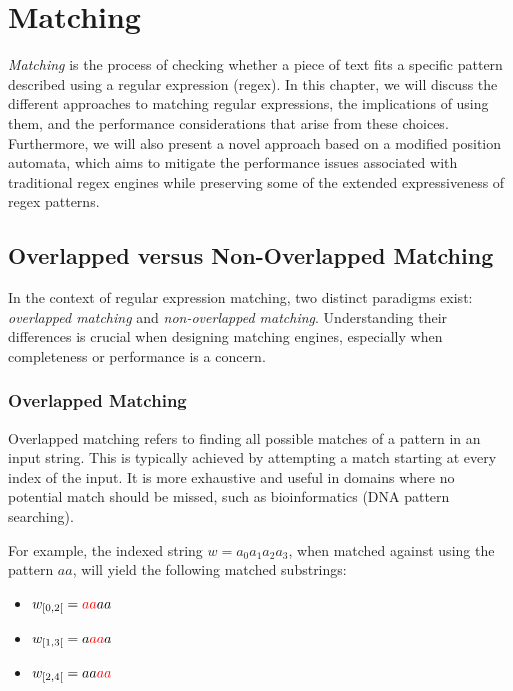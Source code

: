 \chapter{Matching}\label{chap:matching}

\emph{Matching} is the process of checking whether a piece of text fits a specific pattern described using a regular expression (regex).
In this chapter, we will discuss the different approaches to matching regular expressions, the implications of using them, and the performance considerations that arise from these choices. Furthermore, we will also present a novel approach based on a modified position automata, which aims to mitigate the performance issues associated with traditional regex engines while preserving some of the extended expressiveness of regex patterns.

\section{Overlapped versus Non-Overlapped Matching}
\label{sec:overlap-vs-nonoverlap}

In the context of regular expression matching, two distinct paradigms exist: \emph{overlapped matching} and \emph{non-overlapped matching}. Understanding their differences is crucial when designing matching engines, especially when completeness or performance is a concern.

\subsection*{Overlapped Matching}
Overlapped matching refers to finding all possible matches of a pattern in an input string. This is typically achieved by attempting a match starting at every index of the input. It is more exhaustive and useful in domains where no potential match should be missed, such as bioinformatics (DNA pattern searching).

For example, the indexed string $w = a_0 a_1 a_2 a_3$, when matched against using the pattern $aa$, will yield the following matched substrings:

\begin{itemize}
	\item $w_{[0,2[} = {\color{red}{aa}}aa$
	\item $w_{[1,3[} = a{\color{red}{aa}}a$
	\item $w_{[2,4[} = aa{\color{red}{aa}}$
\end{itemize}

